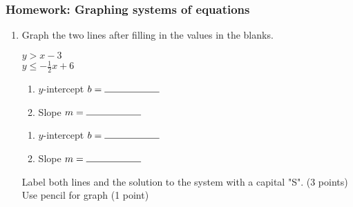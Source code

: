 \documentclass[12pt, twoside]{article}
\begin{document}
\subsubsection*{Homework: Graphing systems of equations}
\begin{enumerate}
    \item Graph the two lines after filling in the values in the blanks.\\[0.5cm]


    \begin{multicols}{2}
      $y> x -3$ \\
      $y \leq -\frac{1}{2} x +6$
    \end{multicols}
    \begin{multicols}{2}
      \raggedcolumns
      \begin{enumerate}
        \item $y$-intercept $b= \rule{2cm}{0.15mm}$ \\[0.5cm]
        \item Slope \hspace{0.7cm} $m= \rule{2cm}{0.15mm}$\\[0.5cm]
      \end{enumerate}
      \begin{enumerate}
        \item $y$-intercept $b= \rule{2cm}{0.15mm}$ \\[0.5cm]
        \item Slope \hspace{0.7cm} $m= \rule{2cm}{0.15mm}$\\[0.5cm]
      \end{enumerate}
    \end{multicols}

    Label both lines and the solution to the system with a capital "S". (3 points) Use pencil for graph (1 point)\\

    \begin{center} %
    \end{center}

\end{enumerate}
\newpage
\setcounter{page}{1}
\end{document}
